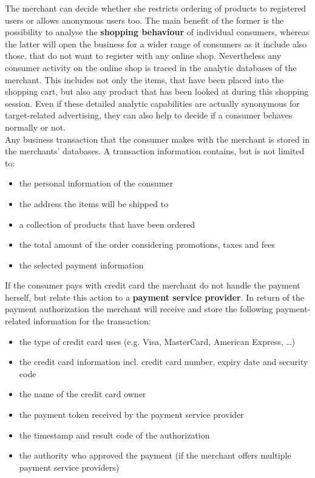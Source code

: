 The merchant can decide whether she restricts ordering of products to registered users or allows anonymous users too. The main benefit of the former is the possibility to analyse the \textbf{shopping behaviour} of individual consumers, whereas the latter will open the business for a wider range of consumers as it include also those, that do not want to register with any online shop. Nevertheless any consumer activity on the online shop is traced in the analytic databases of the merchant. This includes not only the items, that have been placed into the shopping cart, but also any product that has been looked at during this shopping session. Even if these detailed analytic capabilities are actually synonymous for target-related advertising, they can also help to decide if a consumer behaves normally or not. \\

Any business transaction that the consumer makes with the merchant is stored in the merchants' databases. A transaction information contains, but is not limited to:\@

\begin{itemize}
		\item the personal information of the consumer
		\item the address the items will be shipped to
		\item a collection of products that have been ordered
		\item the total amount of the order considering promotions, taxes and fees
		\item the selected payment information
\end{itemize}

If the consumer pays with credit card the merchant do not handle the payment herself, but relate this action to a \textbf{payment service provider}. In return of the payment authorization the merchant will receive and store the following payment-related information for the transaction:\@

\begin{itemize}
		\item the type of credit card uses (e.g. Visa, MasterCard, American Express, \ldots)
		\item the credit card information incl. credit card number, expiry date and security code
		\item the name of the credit card owner
		\item the payment token received by the payment service provider
		\item the timestamp and result code of the authorization
		\item the authority who approved the payment (if the merchant offers multiple payment service providers)
\end{itemize}

